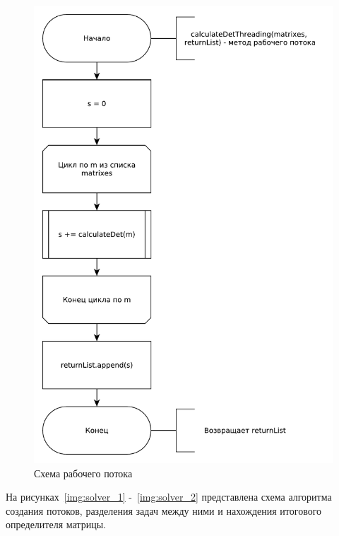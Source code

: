 \documentclass[a4paper,oneside,14pt]{extreport}
\begin{document}
\begin{figure}[H]
	\centering
	\includegraphics[width=0.85\linewidth]{images/thread_schema}
	\caption{Схема рабочего потока}
	\label{img:thread_schema}
\end{figure}

На рисунках~\ref{img:solver_1} -~\ref{img:solver_2} представлена схема алгоритма создания потоков,
разделения задач между ними и нахождения итогового определителя матрицы.
\end{document}
